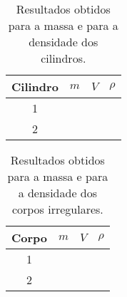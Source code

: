 \begin{table*}[!ht]
	\label{TabelaDadosMassaCil}
	\begin{center}
	\begin{tabular}{cp{25mm}p{25mm}p{25mm}}
		\toprule
		Cilindro & $m$ & $V$ & $\rho$ \\
		\midrule
		\cellcolor[gray]{0.89}1 & \cellcolor[gray]{0.92} & \cellcolor[gray]{0.89} & \cellcolor[gray]{0.92} \\
		\cellcolor[gray]{0.95}2 & \cellcolor[gray]{0.97} & \cellcolor[gray]{0.95} & \cellcolor[gray]{0.97} \\
		\bottomrule
	\end{tabular}
	\end{center}
	\caption{Resultados obtidos para a massa e para a densidade dos cilindros.}
\end{table*}

\begin{table*}[!ht]
	\label{TabelaDadosMassaIrreg}
	\begin{center}
	\begin{tabular}{cp{25mm}p{25mm}p{25mm}}
		\toprule
		Corpo & $m$ & $V$ & $\rho$ \\
		\midrule
		\cellcolor[gray]{0.89}1 & \cellcolor[gray]{0.92} & \cellcolor[gray]{0.89} & \cellcolor[gray]{0.92} \\
		\cellcolor[gray]{0.95}2 & \cellcolor[gray]{0.97} & \cellcolor[gray]{0.95} & \cellcolor[gray]{0.97} \\
		\bottomrule
	\end{tabular}
	\end{center}
	\caption{Resultados obtidos para a massa e para a densidade dos corpos irregulares.}
\end{table*}

